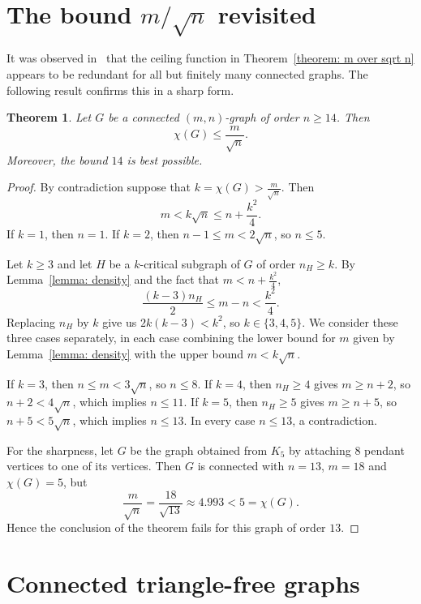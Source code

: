 \documentclass{amsart}
\theoremstyle{plain}
\newtheorem{theorem}{Theorem}
\begin{document}
\section{The bound $m/\sqrt{n}$ revisited}

It was observed in~\cite{akbari2026some} that the ceiling function in Theorem~\ref{theorem: m over sqrt n} appears to be redundant for all but finitely many connected graphs. The following result confirms this in a sharp form.

\begin{theorem} \label{theorem: no ceiling}
Let $G$ be a connected $(m,n)$-graph of order $n \geq 14$. Then
\[
  \chi(G) \leq \frac{m}{\sqrt{n}} .
\]
Moreover, the bound $14$ is best possible.
\end{theorem}

\begin{proof}
By contradiction suppose that $k = \chi(G) > \frac{m}{\sqrt{n}}$. Then
$$
m < k\sqrt{n} \leq n + \frac{k^2}{4}.
$$
If $k = 1$, then $n = 1$. If $k = 2$, then $n-1 \leq m < 2\sqrt{n}$, so $n \leq 5$.

Let $k \geq 3$ and let $H$ be a $k$-critical subgraph of $G$ of order $n_H \geq k$. By Lemma~\ref{lemma: density} and the fact that $m < n + \frac{k^2}{4}$,
$$
\frac{(k-3)n_H}{2} \leq m-n < \frac{k^2}{4}.
$$
Replacing $n_H$ by $k$ give us $2k(k-3) < k^2$, so $k \in \{3,4,5\}$. We consider these three cases separately, in each case combining the lower bound for $m$ given by Lemma~\ref{lemma: density} with the upper bound $m < k\sqrt{n}$.

If $k=3$, then $n \leq m < 3\sqrt{n}$, so $n \leq 8$.
If $k=4$, then $n_H \geq 4$ gives $m \geq n+2$, so $n + 2 < 4\sqrt{n}$, which implies $n \leq 11$.
If $k=5$, then $n_H \geq 5$ gives $m \geq n+5$, so $n+5 < 5\sqrt{n}$, which implies $n \leq 13$.
In every case $n \leq 13$, a contradiction.

For the sharpness, let $G$ be the graph obtained from $K_5$ by attaching $8$ pendant vertices to one of its vertices. Then $G$ is connected with $n = 13$, $m = 18$ and $\chi(G) = 5$, but
$$\frac{m}{\sqrt{n}} = \frac{18}{\sqrt{13}} \approx 4.993 < 5 = \chi(G).$$
Hence the conclusion of the theorem fails for this graph of order $13$.
\end{proof}

\section{Connected triangle-free graphs}
\end{document}
